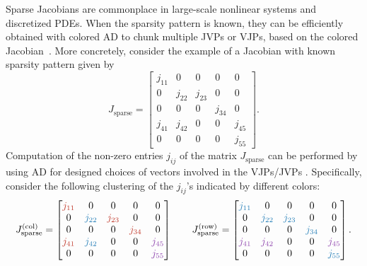 Sparse Jacobians are commonplace in large-scale nonlinear systems and discretized PDEs. 
When the sparsity pattern is known, they can be efficiently obtained with colored AD to chunk multiple JVPs or VJPs, based on the colored Jacobian~\cite{gebremedhin2005color}.
More concretely, consider the example of a Jacobian with known sparsity pattern given by
\begin{equation}
    {J}_{\text{sparse}} = \begin{bmatrix}
        j_{11}  & 0       & 0       & 0       & 0       \\
        0       & j_{22}  & j_{23}  & 0       & 0       \\
        0       & 0       & 0       & j_{34}  & 0       \\
        j_{41}  & j_{42}  & 0       & 0       & j_{45}  \\
        0       & 0       & 0       & 0       & j_{55}
    \end{bmatrix}.
\end{equation}
Computation of the non-zero entries $j_{ij}$ of the matrix ${J}_{\text{sparse}}$ can be performed by using AD for designed choices of vectors involved in the VJPs/JVPs \cite{pal2024nonlinearsolve}.
Specifically, consider the following clustering of the $j_{ij}$'s indicated by different colors:   
\begin{equation}
    {J}^{(\text{col})}_{\text{sparse}} = 
    \begin{bmatrix}
\color{myred}{j_{11}} & 0 & 0 & 0 & 0\\
0 & \color{myblue}{j_{22}} & \color{myred}{j_{23}} & 0 & 0 \\
0 & 0 & 0 & \color{myred}{j_{34}} & 0 \\
\color{myred}{j_{41}} & \color{myblue}{j_{42}} & 0 & 0 & \color{myviolet}{j_{45}} \\
0 & 0 & 0 & 0 & \color{myviolet}{j_{55}}
    \end{bmatrix} 
    \qquad 
    {J}^{(\text{row})}_{\text{sparse}} = 
    \begin{bmatrix}
\color{myblue}{j_{11}} & 0 & 0 & 0 & 0 \\
0 & \color{myblue}{j_{22}}  & \color{myblue}{j_{23}} & 0 & 0 \\
0 & 0 & 0 &\color{myblue}{j_{34}} & 0 \\
\color{myviolet}{j_{41}} & \color{myviolet}{j_{42}} & 0 & 0 & \color{myviolet}{j_{45}} \\
0 & 0 & 0 & 0 & \color{myblue}{j_{55}}
    \end{bmatrix}.
\end{equation}

